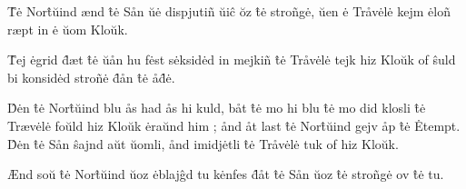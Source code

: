 \documentclass{article}
\begin{document}
\^T\.e Nor\^t\u uind \ae nd \^t\.e S\aa n \u u\.e dispjuti\~n
\u ui\^c \u oz \^t\.e stro\~ng\.e, \u uen \.e Tr\aa v\.el\.e kejm 
\.elo\~n r\ae pt in \.e \u uom Klo\u uk. 

\^Tej \.egrid \^d\ae t \^t\.e \u u\aa n hu f\.est s\.eksid\.ed 
in mejki\~n \^t\.e Tr\aa v\.el\.e tejk hiz Klo\u uk of \^suld bi
konsid\.ed stro\~n\.e \^d\aa n \^t\.e \aa \^d\.e. 

\^D\.en \^t\.e Nor\^t\u uind blu \aa s had \aa s hi kuld, 
b\aa t \^t\.e mo hi blu \^t\.e mo did klosli \^t\.e Tr\ae v\.el\.e 
fo\u uld hiz Klo\u uk \.era\u und him ; 
\aa nd \aa t last \^t\.e Nor\^t\u uind gejv \aa p \^t\.e \.Etempt. 
\^D\.en \^t\.e S\aa n \^sajnd a\u ut \u uomli, \aa nd imidj\.etli 
\^t\.e Tr\aa v\.el\.e tuk of hiz Klo\u uk. 

\AE nd so\u u \^t\.e Nor\^t\u uind \u uoz \.eblaj\^gd tu k\.enfes 
\^d\aa t \^t\.e S\aa n \u uoz \^t\.e stro\~ng\.e ov \^t\.e tu. 
\end{document}
